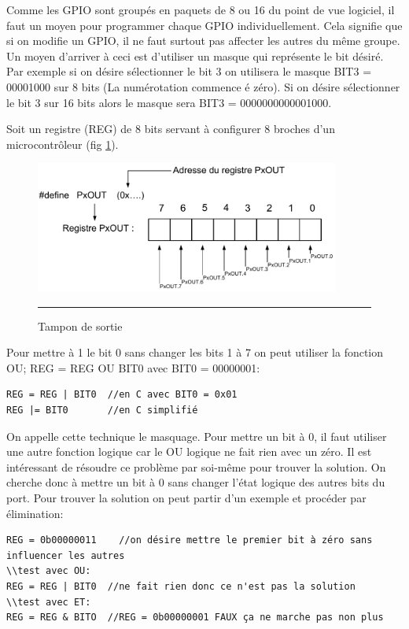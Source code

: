 Comme les GPIO sont groupés en paquets de 8 ou 16 du point de vue logiciel, il faut un moyen pour programmer chaque GPIO individuellement. Cela signifie que si on modifie un GPIO, il ne faut surtout pas affecter les autres du même groupe. Un moyen d'arriver à ceci est d'utiliser un masque qui représente le bit désiré. Par exemple si on désire sélectionner le bit 3 on utilisera le masque BIT3 = 00001000 sur 8 bits (La numérotation commence é zéro). Si on désire sélectionner le bit 3 sur 16 bits alors le masque sera BIT3 = 0000000000001000.

Soit un registre (REG) de 8 bits servant à configurer 8 broches d'un microcontrôleur (fig \ref{fig:pxout}). 

\begin{figure}[htb]
  \centering
  \includegraphics[angle=0, width=10cm]{./Figures/gpio/PxOUT.pdf}
  \rule{35em}{0.5pt}
  \caption[buff out]{Tampon de sortie}
  \label{fig:pxout}
\end{figure}

Pour mettre à 1 le bit 0 sans changer les bits 1 à 7 on peut utiliser la fonction OU; REG = REG OU BIT0 avec BIT0 = 00000001:

\lstset{style=customc}
\begin{lstlisting}
REG = REG | BIT0  //en C avec BIT0 = 0x01
REG |= BIT0		  //en C simplifié
\end{lstlisting}

On appelle cette technique le masquage. Pour mettre un bit à 0, il faut utiliser une autre fonction logique car le OU logique ne fait rien avec un zéro. Il est intéressant de résoudre ce problème par soi-même pour trouver la solution. On cherche donc à mettre un bit à 0 sans changer l'état logique des autres bits du port. Pour trouver la solution on peut partir d'un exemple et procéder par élimination:

\lstset{style=customc}
\begin{lstlisting}
REG = 0b00000011    //on désire mettre le premier bit à zéro sans influencer les autres
\\test avec OU:
REG = REG | BIT0  //ne fait rien donc ce n'est pas la solution
\\test avec ET:
REG = REG & BITO  //REG = 0b00000001 FAUX ça ne marche pas non plus
\end{lstlisting}

